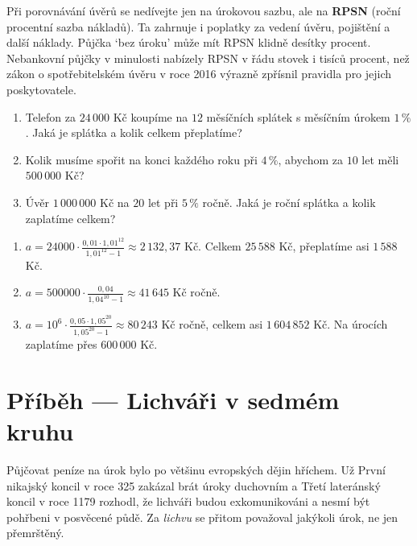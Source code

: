 \begin{note}\label{note:rpsn}
  Při porovnávání úvěrů se nedívejte jen na úrokovou sazbu, ale na \textbf{RPSN} (roční procentní sazba nákladů). Ta zahrnuje i poplatky za vedení úvěru, pojištění a další náklady. Půjčka `bez úroku' může mít RPSN klidně desítky procent. Nebankovní půjčky v minulosti nabízely RPSN v řádu stovek i tisíců procent, než zákon o spotřebitelském úvěru v roce 2016 výrazně zpřísnil pravidla pro jejich poskytovatele.
\end{note}

\begin{problem}
  \begin{enumerate}[label=(\alph*)]
    \item Telefon za $24\,000$ Kč koupíme na $12$ měsíčních splátek s měsíčním úrokem $1\,\%$. Jaká je splátka a kolik celkem přeplatíme?
    \item Kolik musíme spořit na konci každého roku při $4\,\%$, abychom za $10$ let měli $500\,000$ Kč?
    \item Úvěr $1\,000\,000$ Kč na $20$ let při $5\,\%$ ročně. Jaká je roční splátka a kolik zaplatíme celkem?
  \end{enumerate}
\end{problem}

\begin{solution}
  \begin{enumerate}[label=(\alph*)]
    \item $a = 24000\cdot\frac{0{,}01\cdot 1{,}01^{12}}{1{,}01^{12} - 1}\approx 2\,132{,}37$ Kč. Celkem $25\,588$ Kč, přeplatíme asi $1\,588$ Kč.
    \item $a = 500000\cdot\frac{0{,}04}{1{,}04^{10} - 1}\approx 41\,645$ Kč ročně.
    \item $a = 10^6\cdot\frac{0{,}05\cdot 1{,}05^{20}}{1{,}05^{20} - 1}\approx 80\,243$ Kč ročně, celkem asi $1\,604\,852$ Kč. Na úrocích zaplatíme přes $600\,000$ Kč.
  \end{enumerate}
\end{solution}

\section{Příběh --- Lichváři v sedmém kruhu}

Půjčovat peníze na úrok bylo po většinu evropských dějin hříchem. Už První nikajský koncil v roce 325 zakázal brát úroky duchovním a Třetí lateránský koncil v roce 1179 rozhodl, že lichváři budou exkomunikováni a nesmí být pohřbeni v posvěcené půdě. Za \textit{lichvu} se přitom považoval jakýkoli úrok, ne jen přemrštěný.

